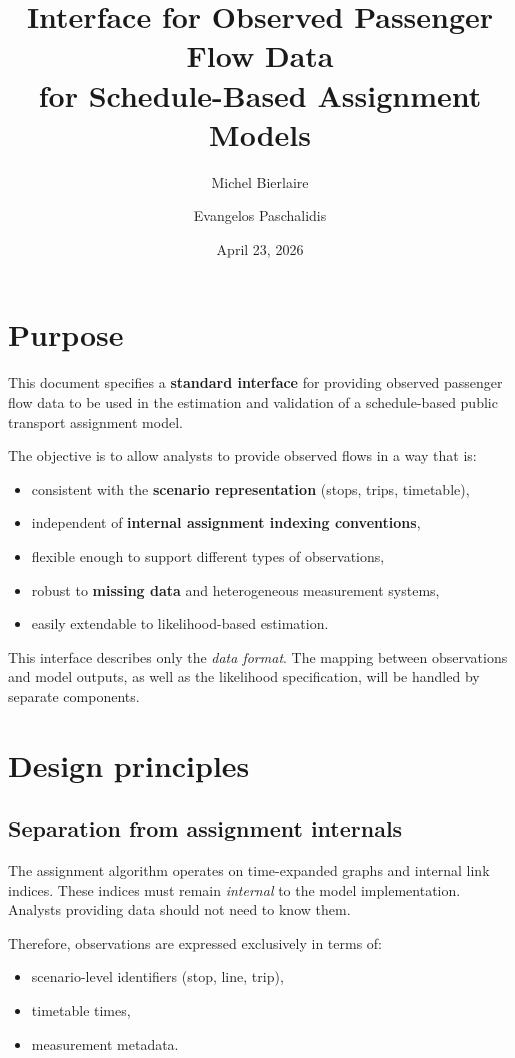\documentclass[11pt,a4paper]{article}
\title{Interface for Observed Passenger Flow Data\\
for Schedule-Based Assignment Models}
\author{Michel Bierlaire \and Evangelos Paschalidis}
\date{April 23, 2026}
\begin{document}
\maketitle

\section{Purpose}

This document specifies a \textbf{standard interface} for providing observed
passenger flow data to be used in the estimation and validation of a
schedule-based public transport assignment model.

The objective is to allow analysts to provide observed flows in a way that is:
\begin{itemize}
    \item consistent with the \textbf{scenario representation} (stops, trips, timetable),
    \item independent of \textbf{internal assignment indexing conventions},
    \item flexible enough to support different types of observations,
    \item robust to \textbf{missing data} and heterogeneous measurement systems,
    \item easily extendable to likelihood-based estimation.
\end{itemize}

This interface describes only the \emph{data format}.  
The mapping between observations and model outputs, as well as the likelihood
specification, will be handled by separate components.

\section{Design principles}

\subsection{Separation from assignment internals}

The assignment algorithm operates on time-expanded graphs and internal link
indices. These indices must remain \emph{internal} to the model implementation.
Analysts providing data should not need to know them.

Therefore, observations are expressed exclusively in terms of:
\begin{itemize}
    \item scenario-level identifiers (stop, line, trip),
    \item timetable times,
    \item measurement metadata.
\end{itemize}
\end{document}
